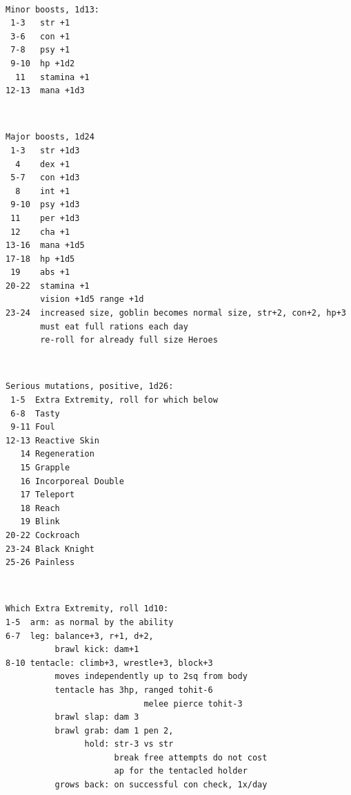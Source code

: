 \

\goodbreak \small \begin{samepage} \begin{verbatim}
Minor boosts, 1d13:
 1-3   str +1
 3-6   con +1
 7-8   psy +1
 9-10  hp +1d2
  11   stamina +1
12-13  mana +1d3
\end{verbatim} \end{samepage} \normalsize

\

\goodbreak \small \begin{samepage} \begin{verbatim}
Major boosts, 1d24
 1-3   str +1d3
  4    dex +1
 5-7   con +1d3
  8    int +1
 9-10  psy +1d3
 11    per +1d3
 12    cha +1
13-16  mana +1d5
17-18  hp +1d5
 19    abs +1
20-22  stamina +1
       vision +1d5 range +1d
23-24  increased size, goblin becomes normal size, str+2, con+2, hp+3
       must eat full rations each day
       re-roll for already full size Heroes
\end{verbatim} \end{samepage} \normalsize

\

\goodbreak \small \begin{samepage} \begin{verbatim}
Serious mutations, positive, 1d26:
 1-5  Extra Extremity, roll for which below
 6-8  Tasty
 9-11 Foul
12-13 Reactive Skin
   14 Regeneration
   15 Grapple
   16 Incorporeal Double
   17 Teleport
   18 Reach
   19 Blink
20-22 Cockroach
23-24 Black Knight
25-26 Painless
\end{verbatim} \end{samepage} \normalsize

\

\goodbreak \small \begin{samepage} \begin{verbatim}
Which Extra Extremity, roll 1d10:
1-5  arm: as normal by the ability
6-7  leg: balance+3, r+1, d+2,
          brawl kick: dam+1
8-10 tentacle: climb+3, wrestle+3, block+3
          moves independently up to 2sq from body
          tentacle has 3hp, ranged tohit-6
                            melee pierce tohit-3
          brawl slap: dam 3
          brawl grab: dam 1 pen 2,
                hold: str-3 vs str
                      break free attempts do not cost
                      ap for the tentacled holder
          grows back: on successful con check, 1x/day
\end{verbatim} \end{samepage} \normalsize

